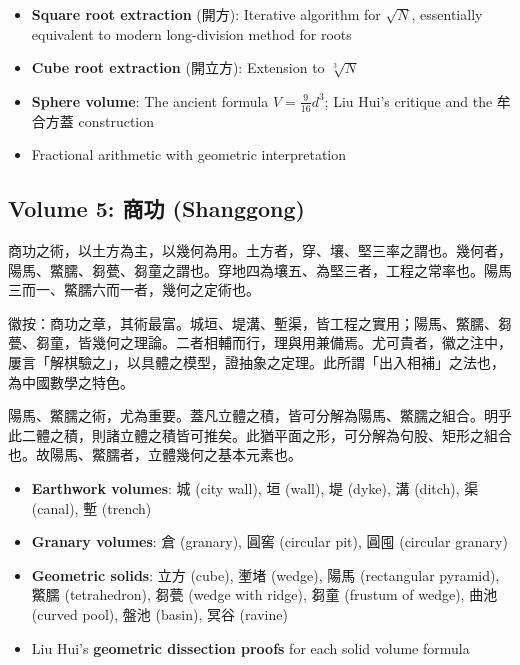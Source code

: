 \documentclass[11pt,a4paper]{article}
\newcommand{\zh}[1]{#1}
\begin{document}
\begin{itemize}[leftmargin=2em]
  \item \textbf{Square root extraction} (\zh{開方}): Iterative algorithm for $\sqrt{N}$, essentially equivalent to modern long-division method for roots
  \item \textbf{Cube root extraction} (\zh{開立方}): Extension to $\sqrt[3]{N}$
  \item \textbf{Sphere volume}: The ancient formula $V = \frac{9}{16}d^3$; Liu Hui's critique and the \zh{牟合方蓋} construction
  \item Fractional arithmetic with geometric interpretation
\end{itemize}

\subsection*{Volume 5: \zh{商功} (Shanggong)}

\begin{commentary}[\zh{劉徽注·商功章總論}]
\zh{%
商功之術，以土方為主，以幾何為用。土方者，穿、壤、堅三率之謂也。幾何者，陽馬、鱉臑、芻甍、芻童之謂也。穿地四為壤五、為堅三者，工程之常率也。陽馬三而一、鱉臑六而一者，幾何之定術也。

徽按：商功之章，其術最富。城垣、堤溝、塹渠，皆工程之實用；陽馬、鱉臑、芻甍、芻童，皆幾何之理論。二者相輔而行，理與用兼備焉。尤可貴者，徽之注中，屢言「解棋驗之」，以具體之模型，證抽象之定理。此所謂「出入相補」之法也，為中國數學之特色。

陽馬、鱉臑之術，尤為重要。蓋凡立體之積，皆可分解為陽馬、鱉臑之組合。明乎此二體之積，則諸立體之積皆可推矣。此猶平面之形，可分解為句股、矩形之組合也。故陽馬、鱉臑者，立體幾何之基本元素也。
}
\end{commentary}

\begin{itemize}[leftmargin=2em]
  \item \textbf{Earthwork volumes}: \zh{城} (city wall), \zh{垣} (wall), \zh{堤} (dyke), \zh{溝} (ditch), \zh{渠} (canal), \zh{塹} (trench)
  \item \textbf{Granary volumes}: \zh{倉} (granary), \zh{圓窖} (circular pit), \zh{圓囤} (circular granary)
  \item \textbf{Geometric solids}: \zh{立方} (cube), \zh{壍堵} (wedge), \zh{陽馬} (rectangular pyramid), \zh{鱉臑} (tetrahedron), \zh{芻甍} (wedge with ridge), \zh{芻童} (frustum of wedge), \zh{曲池} (curved pool), \zh{盤池} (basin), \zh{冥谷} (ravine)
  \item Liu Hui's \textbf{geometric dissection proofs} for each solid volume formula
\end{itemize}
\end{document}
